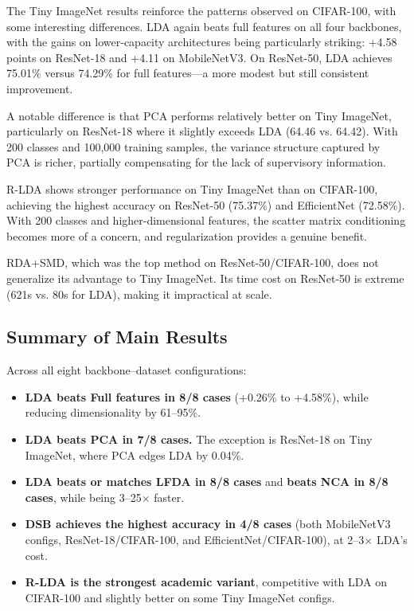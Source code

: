 The Tiny ImageNet results reinforce the patterns observed on CIFAR-100, with some interesting differences. LDA again beats full features on all four backbones, with the gains on lower-capacity architectures being particularly striking: +4.58 points on ResNet-18 and +4.11 on MobileNetV3. On ResNet-50, LDA achieves 75.01\% versus 74.29\% for full features---a more modest but still consistent improvement.

A notable difference is that PCA performs relatively better on Tiny ImageNet, particularly on ResNet-18 where it slightly exceeds LDA (64.46 vs. 64.42). With 200 classes and 100,000 training samples, the variance structure captured by PCA is richer, partially compensating for the lack of supervisory information.

R-LDA shows stronger performance on Tiny ImageNet than on CIFAR-100, achieving the highest accuracy on ResNet-50 (75.37\%) and EfficientNet (72.58\%). With 200 classes and higher-dimensional features, the scatter matrix conditioning becomes more of a concern, and regularization provides a genuine benefit.

RDA+SMD, which was the top method on ResNet-50/CIFAR-100, does not generalize its advantage to Tiny ImageNet. Its time cost on ResNet-50 is extreme (621s vs. 80s for LDA), making it impractical at scale.

\subsection{Summary of Main Results}

Across all eight backbone--dataset configurations:
\begin{itemize}[leftmargin=*]
    \item \textbf{LDA beats Full features in 8/8 cases} (+0.26\% to +4.58\%), while reducing dimensionality by 61--95\%.
    \item \textbf{LDA beats PCA in 7/8 cases.} The exception is ResNet-18 on Tiny ImageNet, where PCA edges LDA by 0.04\%.
    \item \textbf{LDA beats or matches LFDA in 8/8 cases} and \textbf{beats NCA in 8/8 cases}, while being 3--25$\times$ faster.
    \item \textbf{DSB achieves the highest accuracy in 4/8 cases} (both MobileNetV3 configs, ResNet-18/CIFAR-100, and EfficientNet/CIFAR-100), at 2--3$\times$ LDA's cost.
    \item \textbf{R-LDA is the strongest academic variant}, competitive with LDA on CIFAR-100 and slightly better on some Tiny ImageNet configs.
\end{itemize}

